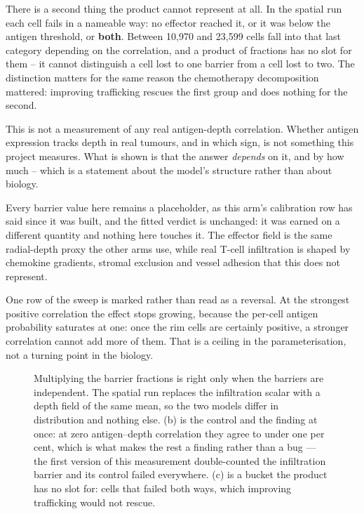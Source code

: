 \documentclass[11pt,twoside,openright]{report}
\begin{document}
There is a second thing the product cannot represent at all. In the spatial run each cell fails in a nameable way: no effector reached it, or it was below the antigen threshold, or \textbf{both}. Between 10,970 and 23,599 cells fall into that last category depending on the correlation, and a product of fractions has no slot for them -- it cannot distinguish a cell lost to one barrier from a cell lost to two. The distinction matters for the same reason the chemotherapy decomposition mattered: improving trafficking rescues the first group and does nothing for the second.

\begin{refusal}
This is not a measurement of any real antigen-depth correlation. Whether antigen expression tracks depth in real tumours, and in which sign, is not something this project measures. What is shown is that the answer \textit{depends} on it, and by how much -- which is a statement about the model's structure rather than about biology.

Every barrier value here remains a placeholder, as this arm's calibration row has said since it was built, and the fitted verdict is unchanged: it was earned on a different quantity and nothing here touches it. The effector field is the same radial-depth proxy the other arms use, while real T-cell infiltration is shaped by chemokine gradients, stromal exclusion and vessel adhesion that this does not represent.

One row of the sweep is marked rather than read as a reversal. At the strongest positive correlation the effect stops growing, because the per-cell antigen probability saturates at one: once the rim cells are certainly positive, a stronger correlation cannot add more of them. That is a ceiling in the parameterisation, not a turning point in the biology.
\end{refusal}

\begin{figure}[tbp]
\setcounter{figure}{44}
\caption{Multiplying the barrier fractions is right only when the barriers are independent. The spatial run replaces the infiltration scalar with a depth field of the same mean, so the two models differ in distribution and nothing else. (b) is the control and the finding at once: at zero antigen--depth correlation they agree to under one per cent, which is what makes the rest a finding rather than a bug --- the first version of this measurement double-counted the infiltration barrier and its control failed everywhere. (c) is a bucket the product has no slot for: cells that failed both ways, which improving trafficking would not rescue.}
\label{fig:fig49_cart_independence}
\end{figure}
\end{document}
